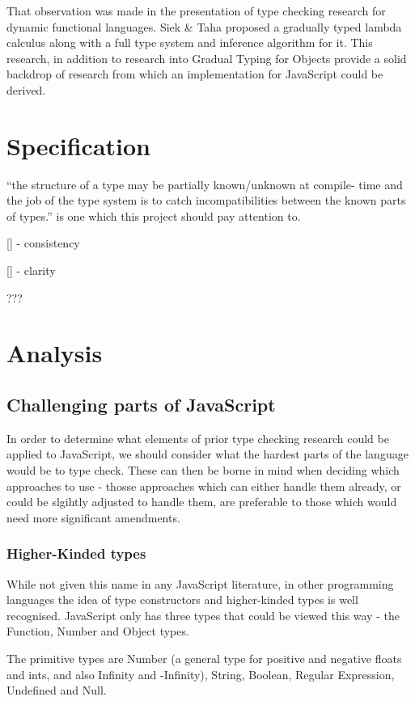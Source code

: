 \documentclass[british, twoside]{bhamthesis}
\theoremstyle{definition}
\begin{document}
      That observation was made in the presentation of type checking research for dynamic functional languages. Siek \& Taha proposed a gradually typed lambda calculus along with a full type system and inference algorithm for it\autocite{Siek2006}. This research, in addition to research into Gradual Typing for Objects\autocite{Siek2007} provide a solid backdrop of research from which an implementation for JavaScript could be derived.


\chapter{Specification}

  ``the structure of a type may be partially known/unknown at compile- time and the job of the type system is to catch incompatibilities between the known parts of types.''\autocite{Siek2006} is one which this project should pay attention to.

  [] - consistency

  [] - clarity

  ???

\chapter{Analysis}

  \section{Challenging parts of JavaScript}

    In order to determine what elements of prior type checking research could be applied to JavaScript, we should consider what the hardest parts of the language would be to type check. These can then be borne in mind when deciding which approaches to use - thosse approaches which can either handle them already, or could be slgihtly adjusted to handle them, are preferable to those which would need more significant amendments.

  \subsection{Higher-Kinded types}
    While not given this name in any JavaScript literature, in other programming languages the idea of type constructors and higher-kinded types is well recognised. JavaScript only has three types that could be viewed this way - the Function, Number and Object types.

    The primitive types are Number (a general type for positive and negative floats and ints, and also Infinity and -Infinity), String, Boolean, Regular Expression, Undefined and Null.
\end{document}

